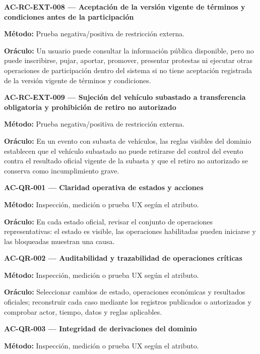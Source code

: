 \documentclass[10pt,letterpaper]{article}
\begin{document}
\noindent\textbf{AC-RC-EXT-008 --- Aceptación de la versión vigente de términos y condiciones antes de la participación}\par
\textbf{Método:} Prueba negativa/positiva de restricción externa.\par
\textbf{Oráculo:} Un usuario puede consultar la información pública disponible, pero no puede inscribirse, pujar, aportar, promover, presentar protestas ni ejecutar otras operaciones de participación dentro del sistema si no tiene aceptación registrada de la versión vigente de términos y condiciones.\par\vspace{0.45em}
\noindent\textbf{AC-RC-EXT-009 --- Sujeción del vehículo subastado a transferencia obligatoria y prohibición de retiro no autorizado}\par
\textbf{Método:} Prueba negativa/positiva de restricción externa.\par
\textbf{Oráculo:} En un evento con subasta de vehículos, las reglas visibles del dominio establecen que el vehículo subastado no puede retirarse del control del evento contra el resultado oficial vigente de la subasta y que el retiro no autorizado se conserva como incumplimiento grave.\par\vspace{0.45em}
\noindent\textbf{AC-QR-001 --- Claridad operativa de estados y acciones}\par
\textbf{Método:} Inspección, medición o prueba UX según el atributo.\par
\textbf{Oráculo:} En cada estado oficial, revisar el conjunto de operaciones representativas: el estado es visible, las operaciones habilitadas pueden iniciarse y las bloqueadas muestran una causa.\par\vspace{0.45em}
\noindent\textbf{AC-QR-002 --- Auditabilidad y trazabilidad de operaciones críticas}\par
\textbf{Método:} Inspección, medición o prueba UX según el atributo.\par
\textbf{Oráculo:} Seleccionar cambios de estado, operaciones económicas y resultados oficiales; reconstruir cada caso mediante los registros publicados o autorizados y comprobar actor, tiempo, datos y reglas aplicables.\par\vspace{0.45em}
\noindent\textbf{AC-QR-003 --- Integridad de derivaciones del dominio}\par
\textbf{Método:} Inspección, medición o prueba UX según el atributo.\par
\end{document}
